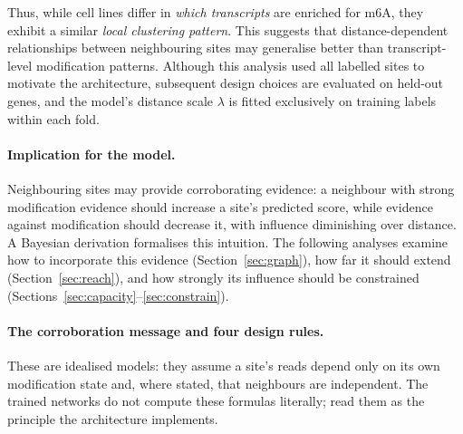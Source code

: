 \documentclass[11pt,a4paper]{article}
\begin{document}
Thus, while cell lines differ in \emph{which transcripts} are enriched for m6A, they exhibit a similar \emph{local clustering pattern}. This suggests that distance-dependent relationships between neighbouring sites may generalise better than transcript-level modification patterns. Although this analysis used all labelled sites to motivate the architecture, subsequent design choices are evaluated on held-out genes, and the model's distance scale $\lambda$ is fitted exclusively on training labels within each fold.

\paragraph{Implication for the model.}
Neighbouring sites may provide corroborating evidence: a neighbour with strong modification evidence should increase a site's predicted score, while evidence against modification should decrease it, with influence diminishing over distance. A Bayesian derivation formalises this intuition. The following analyses examine how to incorporate this evidence (Section~\ref{sec:graph}), how far it should extend (Section~\ref{sec:reach}), and how strongly its influence should be constrained (Sections~\ref{sec:capacity}--\ref{sec:constrain}).


\paragraph{The corroboration message and four design rules.}
\label{app:message}
These are idealised models: they assume a site's reads depend only on its own
modification state and, where stated, that neighbours are independent. The
trained networks do not compute these formulas literally; read them as the
principle the architecture implements.
\end{document}
